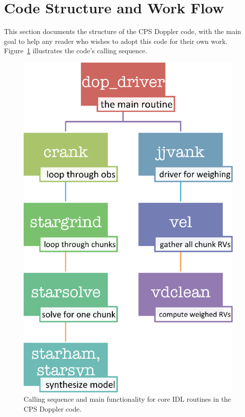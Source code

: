 \section{Code Structure and Work Flow}

This section documents the structure of the CPS Doppler code, with the
main goal to help any reader who wishes to adopt this code for their
own work. Figure~\ref{doppler:fig:flowchart} illustrates the code's
calling sequence. 


\begin{figure}
  \centering
\includegraphics[scale=0.6]{doppler/flowchart.eps}
\caption{Calling sequence and main functionality for core IDL
  routines in the CPS Doppler code. \label{doppler:fig:flowchart}}
\end{figure}


